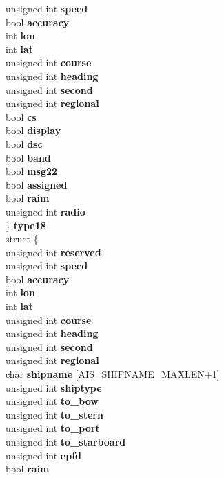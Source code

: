 \begin{DoxyCompactItemize}
{\begin{tabbing}
\>\>unsigned int {\bfseries speed}\\
\>\>bool {\bfseries accuracy}\\
\>\>int {\bfseries lon}\\
\>\>int {\bfseries lat}\\
\>\>unsigned int {\bfseries course}\\
\>\>unsigned int {\bfseries heading}\\
\>\>unsigned int {\bfseries second}\\
\>\>unsigned int {\bfseries regional}\\
\>\>bool {\bfseries cs}\\
\>\>bool {\bfseries display}\\
\>\>bool {\bfseries dsc}\\
\>\>bool {\bfseries band}\\
\>\>bool {\bfseries msg22}\\
\>\>bool {\bfseries assigned}\\
\>\>bool {\bfseries raim}\\
\>\>unsigned int {\bfseries radio}\\
\>\} {\bfseries type18}\\
\>struct \{\\
\>\>unsigned int {\bfseries reserved}\\
\>\>unsigned int {\bfseries speed}\\
\>\>bool {\bfseries accuracy}\\
\>\>int {\bfseries lon}\\
\>\>int {\bfseries lat}\\
\>\>unsigned int {\bfseries course}\\
\>\>unsigned int {\bfseries heading}\\
\>\>unsigned int {\bfseries second}\\
\>\>unsigned int {\bfseries regional}\\
\>\>char {\bfseries shipname} \mbox{[}AIS\_SHIPNAME\_MAXLEN+1\mbox{]}\\
\>\>unsigned int {\bfseries shiptype}\\
\>\>unsigned int {\bfseries to\_bow}\\
\>\>unsigned int {\bfseries to\_stern}\\
\>\>unsigned int {\bfseries to\_port}\\
\>\>unsigned int {\bfseries to\_starboard}\\
\>\>unsigned int {\bfseries epfd}\\
\>\>bool {\bfseries raim}\\

\end{tabbing}}
\end{DoxyCompactItemize}
